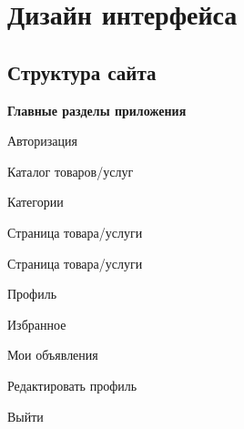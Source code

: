 \newpage
\section{Дизайн интерфейса}


\subsection{Структура сайта}

\textbf{Главные разделы приложения}

\begin{compactitem}
    \item Авторизация
    \item Каталог товаров/услуг
        \begin{compactitem}
            \item Категории
                \begin{compactitem}
                    \item Страница товара/услуги
                \end{compactitem}
            \item Страница товара/услуги
        \end{compactitem}
        
    \item Профиль
        \begin{compactitem}
            \item Избранное
            \item Мои объявления 
            \item Редактировать профиль
            \item Выйти
        \end{compactitem}
        
\end{compactitem}



